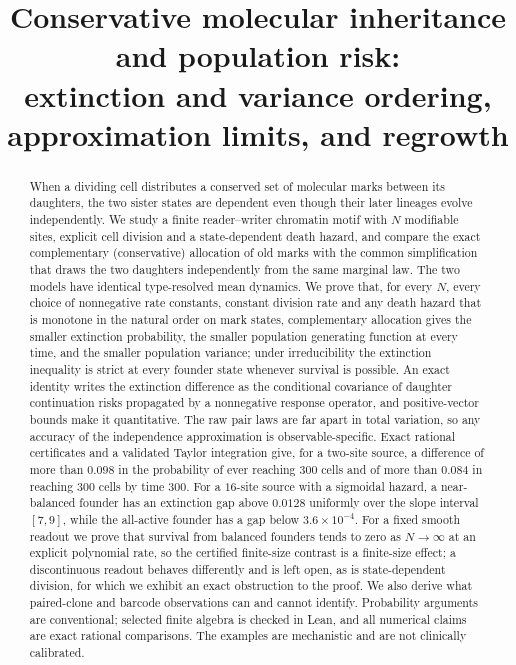 \documentclass[11pt]{article}
\title{Conservative molecular inheritance and population risk:\\
extinction and variance ordering, approximation limits, and regrowth}
\author{}
\date{}
\theoremstyle{remark}
\begin{document}
\maketitle

\begin{abstract}
When a dividing cell distributes a conserved set of molecular marks between
its daughters, the two sister states are dependent even though their later
lineages evolve independently. We study a finite reader--writer chromatin
motif with $N$ modifiable sites, explicit cell division and a
state-dependent death hazard, and compare the exact complementary
(conservative) allocation of old marks with the common simplification that
draws the two daughters independently from the same marginal law. The two
models have identical type-resolved mean dynamics. We prove that, for every
$N$, every choice of nonnegative rate constants, constant division rate and
any death hazard that is monotone in the natural order on mark states,
complementary allocation gives the smaller extinction probability, the
smaller population generating function at every time, and the smaller
population variance; under irreducibility the extinction inequality is strict
at every founder state whenever survival is possible. An exact identity
writes the extinction difference as the conditional covariance of daughter
continuation risks propagated by a nonnegative response operator, and
positive-vector bounds make it quantitative. The raw pair laws are far apart
in total variation, so any accuracy of the independence approximation is
observable-specific. Exact rational certificates and a validated
Taylor integration give, for a two-site source, a difference of more than
$0.098$ in the probability of ever reaching $300$ cells and of more than
$0.084$ in reaching $300$ cells by time $300$. For a $16$-site source with a
sigmoidal hazard, a near-balanced founder has an extinction gap above
$0.0128$ uniformly over the slope interval $[7,9]$, while the all-active
founder has a gap below $3.6\times10^{-4}$. For a fixed smooth readout we
prove that survival from balanced founders tends to zero as $N\to\infty$ at
an explicit polynomial rate, so the certified finite-size contrast is a
finite-size effect; a discontinuous readout behaves differently and is left
open, as is state-dependent division, for which we exhibit an exact
obstruction to the proof. We also derive what paired-clone and barcode
observations can and cannot identify. Probability arguments are conventional;
selected finite algebra is checked in Lean, and all numerical claims are exact
rational comparisons. The examples are mechanistic and are not clinically
calibrated.
\end{abstract}
\end{document}
